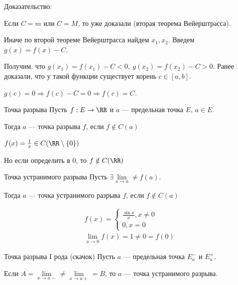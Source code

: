 Доказательство:

Если \( C = m \) или \( C = M \), то уже доказали (вторая теорема Вейерштрасса).

Иначе по второй теореме Вейерштрасса найдем \( x_1, x_2 \).
Введем \( g(x) = f(x) - C \).

Получим, что \( g(x_1) = f(x_1) - C < 0, \ g(x_2) = f(x_2) - C > 0 \).
Ранее доказали, что у такой функции существует корень \( c \in [a, b] \).

\( g(c) = 0 \Rightarrow f(c) - C = 0 \Rightarrow f(c) = C \).

\begin{defn}{Точка разрыва}{}
    Пусть \( f : E \to \RR \) и \( a \) --- предельная точка \( E \), \( a \in E \).

    Тогда \( a \) --- точка разрыва \( f \), если \( f \notin C(a) \)
\end{defn}

\begin{example}{}{}
    \( f(x) = \frac{1}{x} \in C(\RR \setminus \{ 0 \}) \)

    Но если определить в \( 0 \), то \( f \notin C(\RR) \)
\end{example}

\begin{defn}{Точка устранимого разрыва}{}
    Пусть \( \exists \lim\limits_{x \to a} \neq f(a) \).

    Тогда \( a \) --- точка устранимого разрыва \( f \), если \( f \notin C(a) \)
\end{defn}

\begin{example}{}{}
    \begin{gather*}
        f(x)
        =
        \begin{cases}
            \frac{\sin x}{x}, x \neq 0
            \\
            0, x = 0
        \end{cases}
        \\
        \lim\limits_{x \to 0} f(x) = 1 \neq 0 = f(0)
    \end{gather*}
\end{example}

\begin{defn}{Точка разрыва I рода (скачок)}{}
    Пусть \( a \) --- предельная точка \( E_a^- \) и \( E_a^+ \).

    Если \( A = \lim\limits_{x \to a-} \neq \lim\limits_{x \to a+} = B \),
    то \( a \) --- точка устранимого разрыва.
\end{defn}

